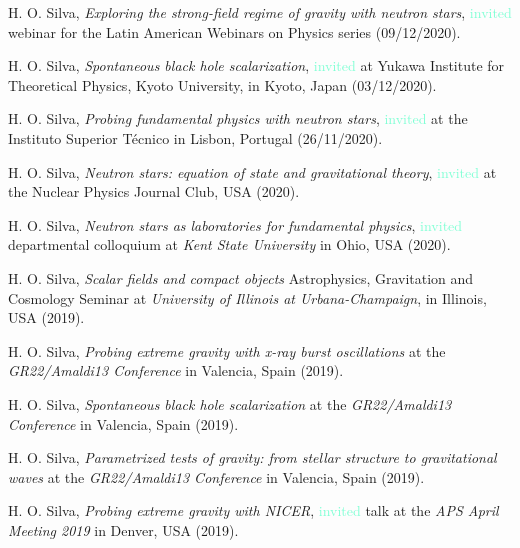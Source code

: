 \documentclass[10pt]{article}
\begin{document}
\begin{bibenum}
    \item H. O. Silva,
    \emph{Exploring the strong-field regime of gravity with neutron stars},
    \textcolor{Aquamarine}{invited} webinar for the Latin American Webinars on Physics series (09/12/2020).

    \item H. O. Silva,
    \emph{Spontaneous black hole scalarization},
    \textcolor{Aquamarine}{invited} at Yukawa Institute for Theoretical Physics, Kyoto University,
    in Kyoto, Japan (03/12/2020).

    \item H. O. Silva,
    \emph{Probing fundamental physics with neutron stars},
    \textcolor{Aquamarine}{invited} at the Instituto Superior T\'ecnico
    in Lisbon, Portugal (26/11/2020).

    \item H. O. Silva,
    \emph{Neutron stars: equation of state and gravitational theory},
    \textcolor{Aquamarine}{invited} at the Nuclear Physics Journal Club, USA (2020).

    \item H. O. Silva,
    \emph{Neutron stars as laboratories for fundamental physics},
    \textcolor{Aquamarine}{invited} departmental colloquium at \emph{Kent State University}
    in Ohio, USA (2020).

    \item H. O. Silva,
    \emph{Scalar fields and compact objects}
    Astrophysics, Gravitation and Cosmology Seminar at \emph{University of Illinois at Urbana-Champaign},
    in Illinois, USA (2019).

    \item H. O. Silva,
    \emph{Probing extreme gravity with x-ray burst oscillations}
    at the \emph{GR22/Amaldi13 Conference}
    in Valencia, Spain (2019).

    \item H. O. Silva,
    \emph{Spontaneous black hole scalarization}
    at the \emph{GR22/Amaldi13 Conference}
    in Valencia, Spain (2019).

    \item H. O. Silva,
    \emph{Parametrized tests of gravity: from stellar structure to gravitational waves}
    at the \emph{GR22/Amaldi13 Conference}
    in Valencia, Spain (2019).

    \item H. O. Silva,
    \emph{Probing extreme gravity with NICER},
    \textcolor{Aquamarine}{invited} talk at the \emph{APS April Meeting 2019}
    in Denver, USA (2019).


\end{bibenum}
\end{document}

